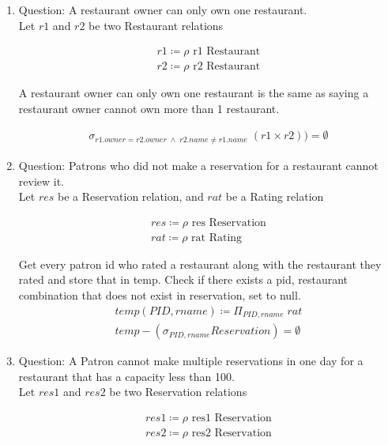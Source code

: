 \documentclass{article}
\begin{document}
\begin{enumerate}
	\item %
	Question: A restaurant owner can only own one restaurant.\\
    
        Let $r1$ and $r2$ be two Restaurant relations
        
        \begin{align}
        r1\coloneqq \rho \text{  r1 Restaurant}  \\
        r2\coloneqq \rho \text{  r2 Restaurant}
		\end{align}     
		
		A restaurant owner can only own one restaurant is the same as saying a restaurant owner cannot own more than 1 restaurant. 
		 
		\begin{align}
        \sigma_{r1.owner = r2.owner \; \wedge \; r2.name \neq r1.name}\;(r1 \times r2)) = \emptyset
		\end{align} 
		
	\item %
	Question: Patrons who did not make a reservation for a restaurant cannot review it.\\
    
        Let $res$ be a Reservation relation, and $rat$ be a Rating relation
        
        \begin{align}
        res\coloneqq \rho \text{  res Reservation}  \\
        rat\coloneqq \rho \text{  rat Rating}
		\end{align}     
		
		Get every patron id who rated a restaurant along with the restaurant they rated and store that in temp.
		 Check if there exists a pid, restaurant combination that does not exist in reservation, set to null.
		\begin{align}
        temp(PID, rname)\coloneqq \Pi_{PID,rname}\; rat\\
        temp - (\sigma_{PID, rname} Reservation) = \emptyset
		\end{align} 
	\item %
	Question: A Patron cannot make multiple reservations in one day for a restaurant that has a capacity less than
100.\\
    
        Let $res1$ and $res2$ be two Reservation relations
        
        \begin{align}
        res1\coloneqq \rho \text{  res1 Reservation}  \\
        res2\coloneqq \rho \text{  res2 Reservation}
		\end{align}     
		

\end{enumerate}
\end{document}
